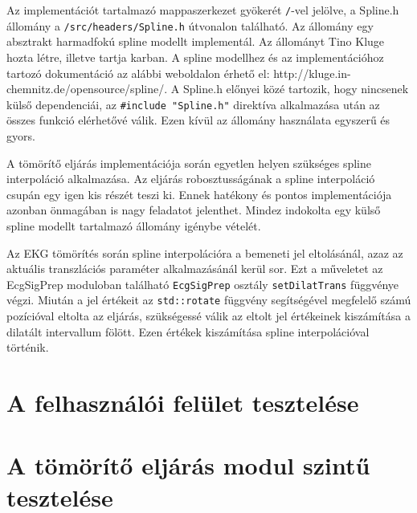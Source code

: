 \documentclass[oneside,titlepage,12pt,a4paper]{report}
\begin{document}
Az implementációt tartalmazó mappaszerkezet gyökerét \texttt{/}-vel jelölve, a Spline.h állomány a \texttt{/src/headers/Spline.h} útvonalon található. Az állomány egy absztrakt harmadfokú spline modellt implementál. Az állományt Tino Kluge hozta létre, illetve tartja karban. A spline modellhez és az implementációhoz tartozó dokumentáció az alábbi weboldalon érhető el: http://kluge.in-chemnitz.de/opensource/spline/. A Spline.h előnyei közé tartozik, hogy nincsenek külső dependenciái, az \texttt{\#include "Spline.h"} direktíva alkalmazása után az összes funkció elérhetővé válik. Ezen kívül az állomány használata egyszerű és gyors.
\par A tömörítő eljárás implementációja során egyetlen helyen szükséges spline interpoláció alkalmazása. Az eljárás robosztusságának a spline interpoláció csupán egy igen kis részét teszi ki. Ennek hatékony és pontos implementációja azonban önmagában is nagy feladatot jelenthet. Mindez indokolta egy külső spline modellt tartalmazó állomány igénybe vételét. 
\par Az EKG tömörítés során spline interpolációra a bemeneti jel eltolásánál, azaz az aktuális transzlációs paraméter alkalmazásánál kerül sor. Ezt a műveletet az EcgSigPrep moduloban található \texttt{EcgSigPrep} osztály \texttt{setDilatTrans} függvénye végzi. Miután a jel értékeit az \texttt{std::rotate} függvény segítségével megfelelő számú pozícióval eltolta az eljárás, szükségessé válik az eltolt jel értékeinek kiszámítása a dilatált intervallum fölött. Ezen értékek kiszámítása spline interpolációval történik.

\section{A felhasználói felület tesztelése}

\section{A tömörítő eljárás modul szintű tesztelése}
\end{document}
